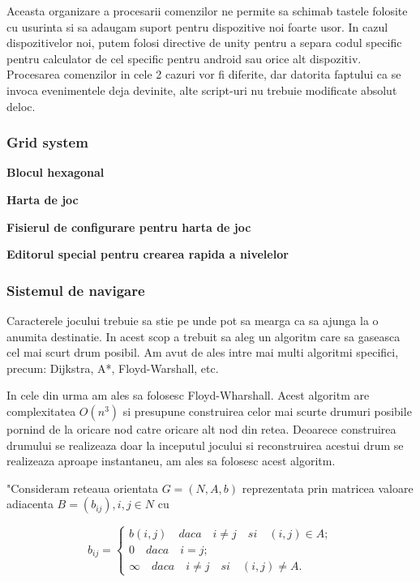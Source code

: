\documentclass[12pt, a4paper]{article}
\begin{document}
	Aceasta organizare a procesarii comenzilor ne permite sa schimab tastele folosite cu usurinta si sa adaugam suport pentru dispozitive noi foarte usor. In cazul dispozitivelor noi, putem folosi directive de unity pentru a separa codul specific pentru calculator de cel specific pentru android sau orice alt dispozitiv. Procesarea comenzilor in cele 2 cazuri vor fi diferite, dar datorita faptului ca se invoca evenimentele deja devinite, alte script-uri nu trebuie modificate absolut deloc.
	
	
	
	
	
	\subsubsection{Grid system}
	
	\textbf{Blocul hexagonal}
	
	\textbf{Harta de joc}
	
	\textbf{Fisierul de configurare pentru harta de joc}
	
	\textbf{Editorul special pentru crearea rapida a nivelelor}
	
	
	
	
	
	\subsubsection{Sistemul de navigare}
	
	Caracterele jocului trebuie sa stie pe unde pot sa mearga ca sa ajunga la o anumita destinatie. In acest scop a trebuit sa aleg un algoritm care sa gaseasca cel mai scurt drum posibil. Am avut de ales intre mai multi algoritmi specifici, precum: Dijkstra, A*, Floyd-Warshall, etc.
	\newline
	
	In cele din urma am ales sa folosesc Floyd-Wharshall. Acest algoritm are complexitatea $O(n^3)$ si presupune construirea celor mai scurte drumuri posibile pornind de la oricare nod catre oricare alt nod din retea. Deoarece construirea drumului se realizeaza doar la inceputul jocului si reconstruirea acestui drum se realizeaza aproape instantaneu, am ales sa folosesc acest algoritm.
	\newline
	
	"Consideram reteaua orientata $G = (N, A, b)$ reprezentata prin matricea valoare adiacenta $B = (b_{ij}), i, j \in N$ cu
	
	\begin{equation*}
		b_{ij} = \begin{cases}
			b(i, j) \quad daca \quad i \neq j \quad si \quad (i, j) \in A; \\
			0 \quad daca \quad i = j; \\
			\infty \quad daca \quad i \neq j \quad si \quad (i, j) \neq A.
		\end{cases}
	\end{equation*}
\end{document}
